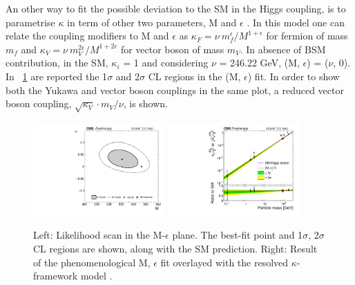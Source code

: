 An other way to fit the possible deviation to the SM in the Higgs coupling, is to parametrise $\kappa$ in term of other two parameters, M and $\epsilon$ \cite{Hcoupling1, Hcoupling2}. In this model one can relate the coupling modifiers to M and $\epsilon$ as $\kappa_F = \nu\ m_f^\epsilon / M^{1+\epsilon}$ for fermion of mass $m_f$ and $\kappa_V = \nu\ m_V^{2\epsilon} / M^{1+2\epsilon}$ for vector boson of mass $m_V$. In absence of BSM contribution, in the SM, $\kappa_i$ = 1 and considering $\nu$ = 246.22 GeV, (M, $\epsilon$) = ($\nu$, 0). In \figurename~\ref{Mespilon} are reported the 1$\sigma$ and 2$\sigma$ CL regions in the (M, $\epsilon$) fit. In order to show both the Yukawa and vector boson couplings in the same plot, a reduced vector boson coupling, $\sqrt{\kappa_V}\cdot m_V/\nu$, is shown.
\begin{figure}[htbp]
\centering
\includegraphics[width=0.45\textwidth]{Images/M_vs_epsilon}
\includegraphics[width=0.45\textwidth]{Images/Hcoupling}
\caption{Left: Likelihood scan in the M-$\epsilon$ plane. The best-fit point and 1$\sigma$, 2$\sigma$ CL regions are shown, along with the SM prediction. Right: Result of the phenomenological M, $\epsilon$ fit overlayed with the resolved $\kappa$-framework model \cite{LatestHiggsCMS}.}
\label{Mespilon}
\end{figure}

